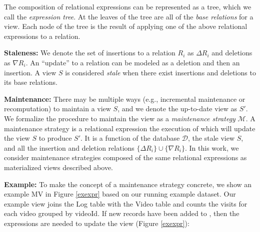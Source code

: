 The composition of relational expressions can be represented as a tree, which we call the \emph{expression tree}.
At the leaves of the tree are all of the \emph{base relations} for a view.
Each node of the tree is the result of applying one of the above relational expressions to a relation.

\vspace{.25em}

\noindent \textbf{Staleness: } We denote the set of insertions to a relation $R_i$ as $\Delta R_i$ and deletions as $\nabla R_i$.
An ``update'' to a relation can be modeled as a deletion and then an insertion.
A view $S$ is considered \emph{stale} when there exist insertions and deletions to its base relations.

\vspace{.25em}

\noindent \textbf{Maintenance: } There may be multiple ways (e.g., incremental maintenance or recomputation) to maintain a view $S$, and we denote the up-to-date view as $S'$.
We formalize the procedure to maintain the view as a \emph{maintenance strategy} $\mathcal{M}$.
A maintenance strategy is a relational expression the execution of which will update the view $S$ to produce $S'$.
It is a function of the database $\mathcal{D}$, the stale view $S$, and all the insertion and deletion relations $\{\Delta R_i\} \cup \{\nabla R_i\}$. 
In this work, we consider maintenance strategies composed of the same relational expressions as materialized views described above.



\vspace{.25em}

\noindent \textbf{Example: }
To make the concept of a maintenance strategy concrete, we show an example MV in Figure \ref{exexpr} based on our running example dataset.
Our example view joins the Log table with the Video table and counts the visits for each video grouped by \textsf{videoId}.
If new records have been added to , then the expressions are needed to update the view (Figure \ref{exexpr}):

